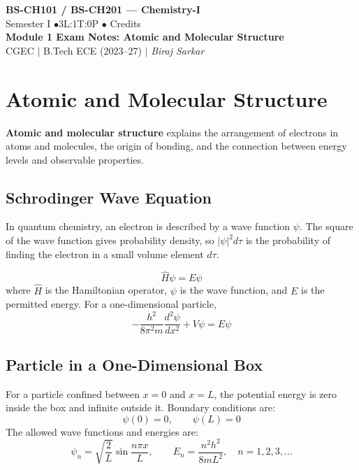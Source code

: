 \documentclass[12pt,a4paper]{article}
\begin{document}
\begin{center}
  {\LARGE\bfseries\color{myred} BS-CH101 / BS-CH201 --- Chemistry-I}\\[5pt]
  {\normalsize\color{mydark} Semester I \quad$\bullet$\quad 3L:1T:0P \quad$\bullet$ Credits}\\[3pt]
  {\normalsize\color{myteal}\textbf{Module 1 Exam Notes: Atomic and Molecular Structure}}\\[3pt]
  {\small\color{mydark} CGEC \;$|$\; B.Tech ECE (2023--27) \;$|$\; \textit{Biraj Sarkar}}
\end{center}
\vspace{2pt}
\noindent{\color{myred}\rule{\linewidth}{1.5pt}}
\vspace{2pt}

\hypersetup{linkcolor=mydark}
\tableofcontents
\hypersetup{linkcolor=myteal}
\newpage
\section{Atomic and Molecular Structure}

\begin{tcolorbox}[defbox]
\textbf{Atomic and molecular structure} explains the arrangement of electrons in atoms and molecules, the origin of bonding, and the connection between energy levels and observable properties.
\end{tcolorbox}

\subsection{Schrodinger Wave Equation}
In quantum chemistry, an electron is described by a wave function $\psi$. The square of the wave function gives probability density, so $|\psi|^2 d\tau$ is the probability of finding the electron in a small volume element $d\tau$.

\begin{tcolorbox}[formulabox, title={Time-Independent Schrodinger Equation}]
\[
\hat{H}\psi = E\psi
\]
where $\hat{H}$ is the Hamiltonian operator, $\psi$ is the wave function, and $E$ is the permitted energy. For a one-dimensional particle,
\[
-\frac{h^2}{8\pi^2m}\frac{d^2\psi}{dx^2}+V\psi=E\psi
\]
\end{tcolorbox}

\subsection{Particle in a One-Dimensional Box}
For a particle confined between $x=0$ and $x=L$, the potential energy is zero inside the box and infinite outside it. Boundary conditions are:
\[
\psi(0)=0,\qquad \psi(L)=0
\]
The allowed wave functions and energies are:
\[
\psi_n=\sqrt{\frac{2}{L}}\sin\frac{n\pi x}{L},\qquad E_n=\frac{n^2h^2}{8mL^2},\quad n=1,2,3,\ldots
\]
\end{document}
